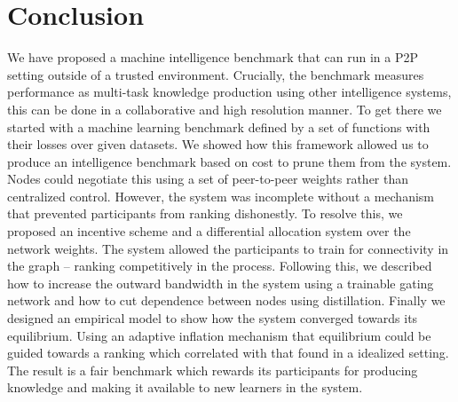 \documentclass{article}
\begin{document}
\section{Conclusion}
\label{conclusion}
We have proposed a machine intelligence benchmark that can run in a P2P setting outside of a trusted environment. Crucially, the benchmark measures performance as multi-task knowledge production using other intelligence systems, this can be done in a collaborative and high resolution manner. To get there we started with a machine learning benchmark defined by a set of functions with their losses over given datasets. We showed how this framework allowed us to produce an intelligence benchmark based on cost to prune them from the system. Nodes could negotiate this using a set of peer-to-peer weights rather than centralized control. However, the system was incomplete without a mechanism that prevented participants from ranking dishonestly. To resolve this, we proposed an incentive scheme and a differential allocation system over the network weights. The system allowed the participants to train for connectivity in the graph -- ranking competitively in the process. Following this, we described how to increase the outward bandwidth in the system using a trainable gating network and how to cut dependence between nodes using distillation. Finally we designed an empirical model to show how the system converged towards its equilibrium. Using an adaptive inflation mechanism that equilibrium could be guided towards a  ranking which correlated with that found in a idealized setting. The result is a fair benchmark which rewards its participants for producing knowledge and making it available to new learners in the system.

\end{document}

